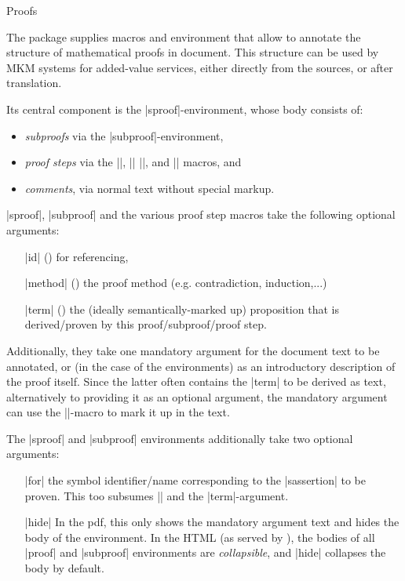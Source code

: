 \begin{sfragment}{Proofs}

The  package supplies macros and environment that allow to annotate the
structure of mathematical proofs in \sTeX document. This structure can be used by MKM
systems for added-value services, either directly from the \sTeX sources, or after
translation.

Its central component is the |sproof|-environment, whose body consists
of:
\begin{itemize}
  \item \emph{subproofs} via the |subproof|-environment,
  \item \emph{proof steps} via the |\spfstep|, |\eqstep|
    |\assumption|, and |\conclude| macros, and
  \item \emph{comments}, via normal text without special markup.
\end{itemize}

|sproof|, |subproof| and the various proof step macros take the following
optional arguments:
\begin{itemize}
  \item[|id|] () for referencing,
  \item[|method|] () the proof method (e.g. contradiction, induction,...)
  \item[|term|] () the (ideally semantically-marked up)
    proposition that is derived/proven by this proof/subproof/proof step.
\end{itemize}
Additionally, they take one mandatory argument for the document text
to be annotated, or (in the case of the environments)
as an introductory description of the proof itself. Since
the latter often contains the |term| to be derived
as text, alternatively to providing it as 
an optional argument, the mandatory argument can use the
|\yield|-macro to mark it up in the text.

The |sproof| and |subproof| environments additionally take
two optional arguments:
\begin{itemize}
  \item[|for|] the symbol identifier/name corresponding to the |sassertion|
    to be proven. This too subsumes |\yield| and the |term|-argument.
  \item[|hide|] In the pdf, this only shows the mandatory argument text
    and hides the body of the environment. In the HTML (as served by \mmt),
    the bodies of all |proof| and |subproof| environments are \emph{collapsible},
    and |hide| collapses the body by default.
\end{itemize}


\end{sfragment}
